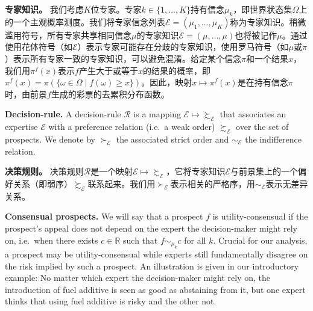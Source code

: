 \documentclass[12pt,a4paper]{article}
\newenvironment{original}
  {\par\noindent\ignorespaces}
  {\par}
\newenvironment{translation}
  {\par\noindent{\color{transblue}\ignorespaces}}
  {\par\medskip}
\newcommand{\R}{\mathbb{R}}
\begin{document}
\begin{translation}
\textbf{专家知识。} 我们考虑$K$位专家。专家$k \in \{1, \dots, K\}$持有信念$\mu_{k}$，即世界状态集$\Omega$上的一个主观概率测度。我们将专家信念列表$\mathcal{E} = (\mu_{1}, \dots, \mu_{K})$称为专家知识。稍微滥用符号，所有专家共享相同信念$\mu$的专家知识$\mathcal{E} = (\mu, \dots, \mu)$也将被记作$\mu$。通过使用花体符号（如$\mathcal{E}$）表示专家可能存在分歧的专家知识，使用罗马符号（如$\mu$或$\pi$）表示所有专家一致的专家知识，可以避免混淆。给定某个信念$\pi$和一个结果$x$，我们用$\pi^{f}(x)$表示$f$产生大于或等于$x$的结果的概率，即$\pi^{f}(x) = \pi(\{\omega \in \Omega \mid f(\omega) \geq x\})$。因此，映射$x \mapsto \pi^{f}(x)$是在持有信念$\pi$时，由前景$f$生成的彩票的去累积分布函数。
\end{translation}

\begin{original}
\textbf{Decision-rule.} A decision-rule $\mathcal{R}$ is a mapping $\mathcal{E} \mapsto \succsim_{\mathcal{E}}$ that associates an expertise $\mathcal{E}$ with a preference relation (i.e.\ a weak order) $\succsim_{\mathcal{E}}$ over the set of prospects. We denote by $\succ_{\mathcal{E}}$ the associated strict order and $\sim_{\mathcal{E}}$ the indifference relation.
\end{original}

\begin{translation}
\textbf{决策规则。} 决策规则$\mathcal{R}$是一个映射$\mathcal{E} \mapsto \succsim_{\mathcal{E}}$，它将专家知识$\mathcal{E}$与前景集上的一个偏好关系（即弱序）$\succsim_{\mathcal{E}}$联系起来。我们用$\succ_{\mathcal{E}}$表示相关的严格序，用$\sim_{\mathcal{E}}$表示无差异关系。
\end{translation}

\begin{original}
\textbf{Consensual prospects.} We will say that a prospect $f$ is utility-consensual if the prospect's appeal does not depend on the expert the decision-maker might rely on, i.e.\ when there exists $c \in \R$ such that $f \sim_{\mu_{k}} c$ for all $k$. Crucial for our analysis, a prospect may be utility-consensual while experts still fundamentally disagree on the risk implied by such a prospect. An illustration is given in our introductory example: No matter which expert the decision-maker might rely on, the introduction of fuel additive is seen as good as abstaining from it, but one expert thinks that using fuel additive is risky and the other not.
\end{original}
\end{document}
